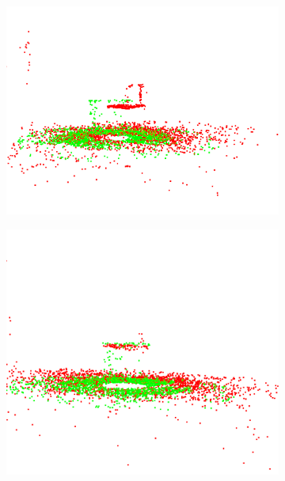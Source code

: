 \documentclass[12pt,titlepage, twoside]{article}
\begin{document}
\begin{figure}[htb]
    \centering 
\begin{subfigure}{0.3\textwidth}
  \includegraphics[width=\linewidth]{./Images/RegistrationBananaT1.png}
  \label{fig:registration:banana:1}
\end{subfigure}\hfil
\begin{subfigure}{0.3\textwidth}
  \includegraphics[width=\linewidth]{./Images/RegistrationBananaT2.png}
  \label{fig:registration:banana:2}
\end{subfigure}\hfil

\end{figure}
\end{document}
